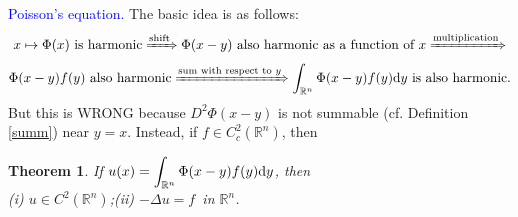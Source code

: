 \documentclass[hyperref,UTF8,12pt]{article}
\numberwithin{equation}{subsection}
\theoremstyle{plain}
\newtheorem{theorem}{Theorem}
\theoremstyle{definition}
\numberwithin{theorem}{section}
\numberwithin{lemma}{section}
\numberwithin{proposition}{section}
\numberwithin{remark}{section}
\numberwithin{corollary}{section}
\numberwithin{definition}{section}
\numberwithin{problem}{section}
\numberwithin{example}{section}
\def\dif{\textup{d}}
\newcommand{\dis}{\displaystyle}
\newcommand{\mr}{\mathbb{R}}
\begin{document}
\noindent\textcolor{blue}{Poisson's equation.} The basic idea is as follows:\[\begin{gathered}
x\mapsto\Phi(x)~\text{is harmonic}\xRightarrow{\text{shift}}\Phi(x-y)~\text{also harmonic as a function of }x\xRightarrow{\text{multiplication}}\\ \Phi(x-y)f(y)~\text{also harmonic}\xRightarrow{\text{sum with respect to }y}\int_{\mr^n}\Phi(x-y)f(y)\dif y~\text{is also harmonic}.
\end{gathered}\]But this is WRONG because $D^2\Phi(x-y)$ is not summable (cf. Definition \ref{summ}) near $y=x$. Instead, if $f\in C_c^2(\mr^n)$, then
\begin{theorem}\label{thm2.1}
If $u(x)=\dis\int_{\mr^n}\Phi(x-y)f(y)\dif y$, then\\[4pt]
\textup{(i)} $u\in C^2(\mr^n)$;\qquad\textup{(ii)} $-\Delta u=f$~in $\mr^n$.
\end{theorem}
\end{document}
